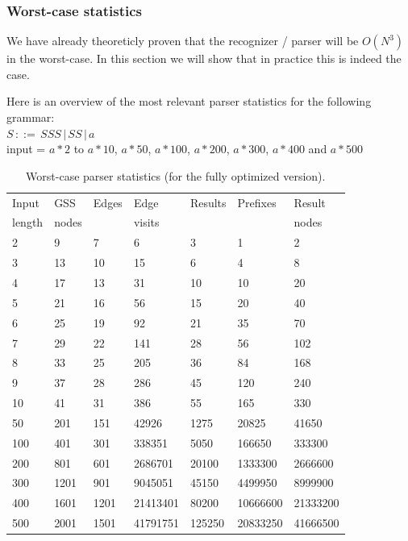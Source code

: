 \documentclass[a4paper,10pt]{article}
\begin{document}
\subsubsection{Worst-case statistics}
We have already theoreticly proven that the recognizer / parser will be $O(N^3)$ in the worst-case. In this section we will show that in practice this is indeed the case.

Here is an overview of the most relevant parser statistics for the following grammar:\\
$S\,::=\,SSS\,|\,SS\,|\,a$\\
input = $a * 2$ to $a * 10$, $a * 50$, $a * 100$, $a * 200$, $a * 300$, $a * 400$ and $a * 500$

\begin{table}[H]
\centering
\begin{tabular}{ | p{7ex} | p{7ex} | p{7ex} | p{10ex} | p{8ex} | p{10ex} | p{10ex} | }
  \hline
  Input & GSS & Edges & Edge & Results & Prefixes & Result \\
  length & nodes & & visits & & & nodes \\
  \hline
  2 & 9 & 7 & 6 & 3 & 1 & 2 \\
  3 & 13 & 10 & 15 & 6 & 4 & 8 \\
  4 & 17 & 13 & 31 & 10 & 10 & 20 \\
  5 & 21 & 16 & 56 & 15 & 20 & 40 \\
  6 & 25 & 19 & 92 & 21 & 35 & 70 \\
  7 & 29 & 22 & 141 & 28 & 56 & 102 \\
  8 & 33 & 25 & 205 & 36 & 84 & 168 \\
  9 & 37 & 28 & 286 & 45 & 120 & 240 \\
  10 & 41 & 31 & 386 & 55 & 165 & 330 \\
  \hline
  50 & 201 & 151 & 42926 & 1275 & 20825 & 41650 \\
  100 & 401 & 301 & 338351 & 5050 & 166650 & 333300 \\
  200 & 801 & 601 & 2686701 & 20100 & 1333300 & 2666600 \\
  300 & 1201 & 901 & 9045051 & 45150 & 4499950 & 8999900 \\
  400 & 1601 & 1201 & 21413401 & 80200 & 10666600 & 21333200 \\
  500 & 2001 & 1501 & 41791751 & 125250 & 20833250 & 41666500 \\
  \hline
\end{tabular}
\caption{Worst-case parser statistics (for the fully optimized version).}
\end{table}
\end{document}
